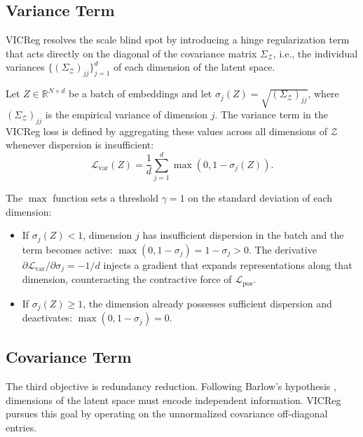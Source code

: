 \documentclass[11pt, oneside, openany]{book}
\begin{document}
\subsection{Variance Term}
\label{sec:5.3.3}

VICReg resolves the scale blind spot by introducing a hinge regularization term that acts directly on the diagonal of the covariance matrix $\Sigma_{\mathcal{Z}}$, i.e., the individual variances $\{(\Sigma_{\mathcal{Z}})_{jj}\}_{j=1}^{d}$ of each dimension of the latent space.

\begin{definition}
\label{def:5.5}
Let $Z \in \mathbb{R}^{N \times d}$ be a batch of embeddings and let $\sigma_{j}(Z) = \sqrt{(\Sigma_{\mathcal{Z}})_{jj}}$, where $(\Sigma_{\mathcal{Z}})_{jj}$ is the empirical variance of dimension $j$. The variance term in the VICReg loss is defined by aggregating these values across all dimensions of $\mathcal{Z}$ whenever dispersion is insufficient:
\begin{equation}
\label{eq:5.25}
\mathcal{L}_{\text{var}}(Z) = \frac{1}{d}\sum_{j=1}^{d} \max\left(0, 1 - \sigma_{j}(Z)\right).
\end{equation}
\end{definition}

The $\max$ function sets a threshold $\gamma = 1$ on the standard deviation of each dimension:
\begin{itemize}
    \item If $\sigma_{j}(Z) < 1$, dimension $j$ has insufficient dispersion in the batch and the term becomes active: $\max(0, 1 - \sigma_{j}) = 1 - \sigma_{j} > 0$. The derivative $\partial \mathcal{L}_{\text{var}} / \partial \sigma_{j} = -1/d$ injects a gradient that expands representations along that dimension, counteracting the contractive force of $\mathcal{L}_{\text{pos}}$.
    \item If $\sigma_{j}(Z) \geq 1$, the dimension already possesses sufficient dispersion and deactivates: $\max(0, 1 - \sigma_{j}) = 0$.
\end{itemize}

\subsection{Covariance Term}
\label{sec:5.3.4}

The third objective is redundancy reduction. Following Barlow's hypothesis \cite{barlow1961possible}, dimensions of the latent space must encode independent information. VICReg pursues this goal by operating on the unnormalized covariance off-diagonal entries.
\end{document}
